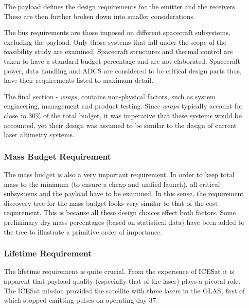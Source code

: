 The payload defines the design requirements for the emitter and the receivers. These are then further broken down into smaller considerations.

The bus requirements are those imposed on different spacecraft subsystems, excluding the payload. Only those systems that fall under the scope of the feasibility study are examined. Spacecraft structures and thermal control are taken to have a standard budget percentage and are not elaborated. Spacecraft power, data handling and \ac{ADCS} are considered to be critical design parts thus, have their requirements listed to maximum detail.

The final section - \emph{wraps}, contains non-physical factors, such as system engineering, management and product testing. Since \emph{wraps} typically account for close to 30\% of the total budget\cite{larson}, it was imperative that these systems would be accounted, yet their design was assumed to be similar to the design of current laser altimetry systems.

\subsubsection{Mass Budget Requirement}
\label{blMBR} 
The mass budget is also a very important requirement. In order to keep total mass to the minimum (to ensure a cheap and unified launch), all critical subsystems and the payload have to be examined. In this sense, the requirement discovery tree for the mass budget looks very similar to that of the cost requirement. This is because all these design choices effect both factors. Some preliminary dry mass percentages (based on statistical data\cite{larson}) have been added to the tree to illustrate a primitive order of importance.

\subsubsection{Lifetime Requirement}
\label{blLBR}
The lifetime requirement is quite crucial. From the experience of ICESat it is apparent that payload quality (especially that of the laser) plays a pivotal role. The ICESat mission provided the satellite with three lasers in the \ac{GLAS}, first of which stopped emitting pulses on operating day 37. 